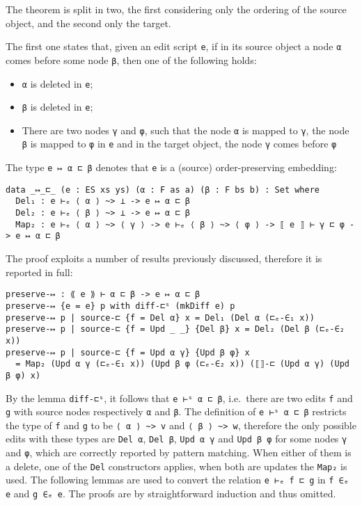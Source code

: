 \documentclass[../Thesis.tex]{subfiles}
\begin{document}
	The theorem is split in two, the first considering only the ordering 
	of the source object, and the second only the target.
	
	The first one states that, given an edit script \texttt{e}, 
	if in its source object a node \texttt{α} comes before
	some node \texttt{β}, then one of the following holds:
\begin{itemize}
	\item \texttt{α} is deleted in \texttt{e};
	\item \texttt{β} is deleted in \texttt{e};
	\item There are two nodes \texttt{γ} and \texttt{φ}, such that the node 
	\texttt{α} is 	mapped to \texttt{γ}, the node \texttt{β} is mapped to 
	\texttt{φ} in \texttt{e} and 
	in the target	object, the node \texttt{γ} comes before \texttt{φ}
\end{itemize}

	The type \texttt{e ↦ α ⊏ β} denotes that \texttt{e} is a (source) 
	order-preserving embedding:
\begin{verbatim}
data _↦_⊏_ (e : ES xs ys) (α : F as a) (β : F bs b) : Set where
  Del₁ : e ⊢ₑ ⟨ α ⟩ ~> ⊥ -> e ↦ α ⊏ β
  Del₂ : e ⊢ₑ ⟨ β ⟩ ~> ⊥ -> e ↦ α ⊏ β
  Map₂ : e ⊢ₑ ⟨ α ⟩ ~> ⟨ γ ⟩ -> e ⊢ₑ ⟨ β ⟩ ~> ⟨ φ ⟩ -> ⟦ e ⟧ ⊢ γ ⊏ φ -> e ↦ α ⊏ β
\end{verbatim}

	The proof exploits a number of results previously discussed,
	therefore it is reported in full:

\begin{verbatim}
preserve-↦ : ⟪ e ⟫ ⊢ α ⊏ β -> e ↦ α ⊏ β
preserve-↦ {e = e} p with diff-⊏ˢ (mkDiff e) p
preserve-↦ p | source-⊏ {f = Del α} x = Del₁ (Del α (⊏ₑ-∈₁ x))
preserve-↦ p | source-⊏ {f = Upd _ _} {Del β} x = Del₂ (Del β (⊏ₑ-∈₂ x))
preserve-↦ p | source-⊏ {f = Upd α γ} {Upd β φ} x 
  = Map₂ (Upd α γ (⊏ₑ-∈₁ x)) (Upd β φ (⊏ₑ-∈₂ x)) (⟦⟧-⊏ (Upd α γ) (Upd β φ) x)
\end{verbatim}

	By the lemma \texttt{diff-⊏ˢ}, it follows that \texttt{e ⊢ˢ α ⊏ β},
	i.e.\ there are two edits \texttt{f} and \texttt{g} with source nodes 
	respectively \texttt{α} and \texttt{β}.
	The definition of \texttt{e ⊢ˢ α ⊏ β} restricts the type of 
	\texttt{f} and \texttt{g} to be \texttt{⟨ α ⟩ \textasciitilde> v} and \texttt{⟨ β ⟩ \textasciitilde> w}, 
	therefore the only possible edits with these types are \texttt{Del α},
	\texttt{Del β}, \texttt{Upd α γ} and \texttt{Upd β φ} for some
	nodes \texttt{γ} and \texttt{φ}, which are
	correctly reported by pattern matching.
	When either of them is a delete, one of the \texttt{Del} constructors applies,
	when both are updates the \texttt{Map₂} is used.
	The following lemmas are used to convert the relation \texttt{e ⊢ₑ f ⊏ g}
	in \texttt{f ∈ₑ e} and \texttt{g ∈ₑ e}.
	The proofs are by straightforward induction and thus omitted.
	
\end{document}
